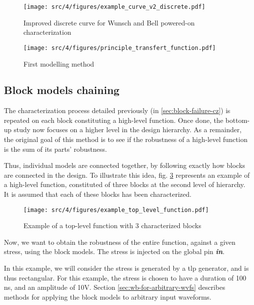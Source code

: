 \begin{figure}[!h]
  \centering
  \texttt{[image: src/4/figures/example\_curve\_v2\_discrete.pdf]}
  \caption{Improved discrete curve for Wunsch and Bell powered-on characterization}
  \label{wb_cz_curve_example_v2_discrete}
\end{figure}

\begin{figure}[!h]
  \centering
  \texttt{[image: src/4/figures/principle\_transfert\_function.pdf]}
  \caption{First modelling method}
  \label{fig:principle-transfert-func}
\end{figure}


\subsection{Block models chaining}
\label{sec:block-chaining}

The characterization process detailed previously (in \ref{sec:block-failure-cz}) is repeated on each block constituting a high-level function.
Once done, the bottom-up study now focuses on a higher level in the design hierarchy.
As a remainder, the original goal of this method is to see if the robustness of a high-level function is the sum of its parts' robustness.

Thus, individual models are connected together, by following exactly how blocks are connected in the design.
To illustrate this idea, fig. \ref{example_toplevel_function} represents an example of a high-level function, constituted of three blocks at the second level of hierarchy.
It is assumed that each of these blocks has been characterized.


\begin{figure}[!h]
  \centering
  \texttt{[image: src/4/figures/example\_top\_level\_function.pdf]}
  \caption{Example of a top-level function with 3 characterized blocks}
  \label{example_toplevel_function}
\end{figure}

Now, we want to obtain the robustness of the entire function, against a given stress, using the block models.
The stress is injected on the global pin \textbf{\textit{in}}.

In this example, we will consider the stress is generated by a \gls{tlp} generator, and is thus rectangular.
For this example, the stress is chosen to have a duration of 100 ns, and an amplitude of 10V.
Section \ref{sec:wb-for-arbitrary-wvfs} describes methods for applying the block models to arbitrary input waveforms.

